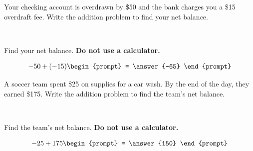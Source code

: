 \documentclass{ximera}[font=12pt]
\begin{document}
\begin{problem}
Your checking account is overdrawn by \$50 and the bank charges you a \$15 overdraft fee.  Write the addition problem to find your net balance.

~ \\[3em]
\begin{multipleChoice}
\end{multipleChoice}


\begin{problem} %
Find your net balance.  \textbf{Do not use a calculator.}

\[ -50 + (-15) \begin{prompt} = \answer{-65} \end{prompt} \]

\end{problem}

\end{problem}


\begin{problem}
A soccer team spent \$25 on supplies for a car wash.  By the end of the day, they earned \$175. Write the addition problem to find the team's net balance.

~ \\[3em]
\begin{multipleChoice}
\end{multipleChoice}


\begin{problem} %
Find the team's net balance.  \textbf{Do not use a calculator.}

\[ -25 + 175 \begin{prompt} = \answer{150} \end{prompt} \]

\end{problem}

\end{problem}
\end{document}
